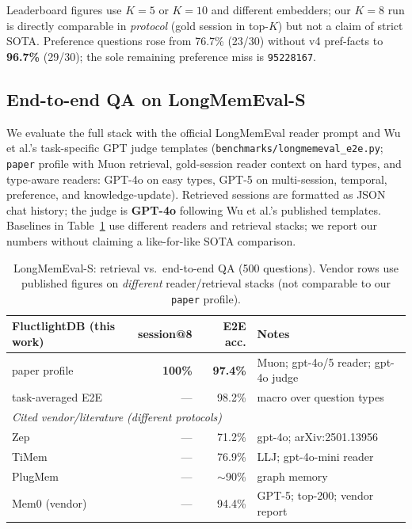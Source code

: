 \documentclass[11pt]{article}
\begin{document}
Leaderboard figures use $K{=}5$ or $K{=}10$ and different embedders; our $K{=}8$
run is directly comparable in \emph{protocol} (gold session in top-$K$) but not
a claim of strict SOTA. Preference questions rose from 76.7\% (23/30) without
v4 pref-facts to \textbf{96.7\%} (29/30); the sole remaining preference miss is
\texttt{95228167}.

\subsection{End-to-end QA on LongMemEval-S}
We evaluate the full stack with the official LongMemEval reader prompt and
Wu et al.'s task-specific GPT judge templates
(\texttt{benchmarks/longmemeval\_e2e.py}; \texttt{paper} profile with Muon
retrieval, gold-session reader context on hard types, and type-aware readers:
GPT-4o on easy types, GPT-5 on multi-session, temporal, preference, and
knowledge-update). Retrieved sessions are formatted as JSON chat history; the
judge is \textbf{GPT-4o} following Wu et al.'s published templates. Baselines in
Table~\ref{tab:longmemeval-e2e} use different readers and retrieval stacks; we
report our numbers without claiming a like-for-like SOTA comparison.

\begin{table}[h]
\centering
\caption{LongMemEval-S: retrieval vs.\ end-to-end QA (500 questions). Vendor rows
use published figures on \emph{different} reader/retrieval stacks (not comparable
to our \texttt{paper} profile).}
\label{tab:longmemeval-e2e}
\small
\begin{tabular}{lrrl}
\toprule
\textbf{FluctlightDB (this work)} & \textbf{session@8} & \textbf{E2E acc.} & \textbf{Notes} \\
\midrule
paper profile & \textbf{100\%} & \textbf{97.4\%} & Muon; gpt-4o/5 reader; gpt-4o judge \\
\quad task-averaged E2E & --- & 98.2\% & macro over question types \\
\midrule
\multicolumn{4}{l}{\textit{Cited vendor/literature (different protocols)}} \\
\midrule
Zep & --- & 71.2\% & gpt-4o; arXiv:2501.13956 \\
TiMem & --- & 76.9\% & LLJ; gpt-4o-mini reader \\
PlugMem & --- & $\sim$90\% & graph memory \\
Mem0 (vendor) & --- & 94.4\% & GPT-5; top-200; vendor report \\
\bottomrule
\end{tabular}
\end{table}
\end{document}
